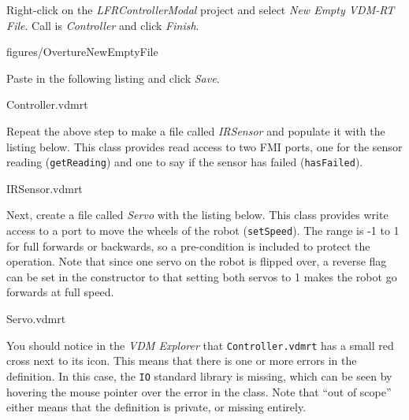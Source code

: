 \documentclass[11pt,a4paper]{../tutorial}
\begin{document}
\begin{instructions}
\item Right-click on the \emph{LFRControllerModal} project and select \emph{New \menusep{} Empty VDM-RT File}. Call is \emph{Controller} and click \emph{Finish}.

    \begin{annotation}[width=0.99\linewidth,trim=0 300 0 0,clip]{figures/OvertureNewEmptyFile}
    \end{annotation}

\item Paste in the following listing and click \emph{Save}.

    \bigskip
    
    {Controller.vdmrt}


\newpage
\item Repeat the above step to make a file called \emph{IRSensor} and populate it with the listing below. This class provides read access to two FMI ports, one for the sensor reading (\texttt{getReading}) and one to say if the sensor has failed (\texttt{hasFailed}).

    \bigskip
    
    {IRSensor.vdmrt}

\item Next, create a file called \emph{Servo} with the listing below. This class provides write access to a port to move the wheels of the robot (\texttt{setSpeed}). The range is -1 to 1 for full forwards or backwards, so a pre-condition is included to protect the operation. Note that since one servo on the robot is flipped over, a reverse flag can be set in the constructor to that setting both servos to 1 makes the robot go forwards at full speed.

    \bigskip
    
    {Servo.vdmrt}

\item You should notice in the \emph{VDM Explorer} that \texttt{Controller.vdmrt} has a small red cross next to its icon. This means that there is one or more errors in the definition. In this case, the \texttt{IO} standard library is missing, which can be seen by hovering the mouse pointer over the error in the class. Note that ``out of scope'' either means that the definition is private, or missing entirely.


\end{instructions}
\end{document}
